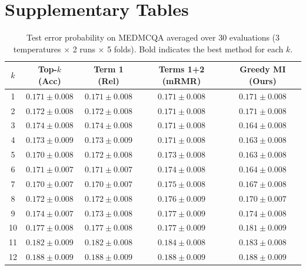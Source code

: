\documentclass{article}
\theoremstyle{plain}
\theoremstyle{definition}
\theoremstyle{remark}
\begin{document}
\section{Supplementary Tables}
\label{app:tables}
\begin{table}[ht]
\centering
\caption{Test error probability on MEDMCQA averaged over 30 evaluations (3 temperatures $\times$ 2 runs $\times$ 5 folds). Bold indicates the best method for each $k$.}
\label{tab:medmcqa_results}
\small
\begin{tabular}{ccccc}
\toprule
$k$ & Top-$k$ (Acc) & Term 1 (Rel) & Terms 1+2 (mRMR) & Greedy MI (Ours) \\
\midrule
1  & $0.171 \pm 0.008$ & $0.171 \pm 0.008$ & $0.171 \pm 0.008$ & $0.171 \pm 0.008$ \\
2  & $0.172 \pm 0.008$ & $0.172 \pm 0.008$ & $0.171 \pm 0.008$ & $0.171 \pm 0.008$ \\
3  & $0.174 \pm 0.008$ & $0.174 \pm 0.008$ & $0.171 \pm 0.008$ & $\mathbf{0.164 \pm 0.008}$ \\
4  & $0.173 \pm 0.009$ & $0.173 \pm 0.009$ & $0.171 \pm 0.008$ & $\mathbf{0.163 \pm 0.008}$ \\
5  & $0.170 \pm 0.008$ & $0.172 \pm 0.008$ & $0.173 \pm 0.008$ & $\mathbf{0.163 \pm 0.008}$ \\
6  & $0.171 \pm 0.007$ & $0.171 \pm 0.007$ & $0.174 \pm 0.008$ & $\mathbf{0.164 \pm 0.008}$ \\
7  & $0.170 \pm 0.007$ & $0.170 \pm 0.007$ & $0.175 \pm 0.008$ & $\mathbf{0.167 \pm 0.008}$ \\
8  & $0.172 \pm 0.008$ & $0.172 \pm 0.008$ & $0.176 \pm 0.009$ & $\mathbf{0.170 \pm 0.007}$ \\
9  & $0.174 \pm 0.007$ & $\mathbf{0.173 \pm 0.008}$ & $0.177 \pm 0.009$ & $0.174 \pm 0.008$ \\
10 & $\mathbf{0.177 \pm 0.008}$ & $\mathbf{0.177 \pm 0.008}$ & $0.177 \pm 0.009$ & $0.181 \pm 0.009$ \\
11 & $0.182 \pm 0.009$ & $\mathbf{0.182 \pm 0.008}$ & $0.184 \pm 0.008$ & $0.183 \pm 0.008$ \\
12 & $0.188 \pm 0.009$ & $0.188 \pm 0.009$ & $0.188 \pm 0.009$ & $0.188 \pm 0.009$ \\
\bottomrule
\end{tabular}
\end{table}
\end{document}
